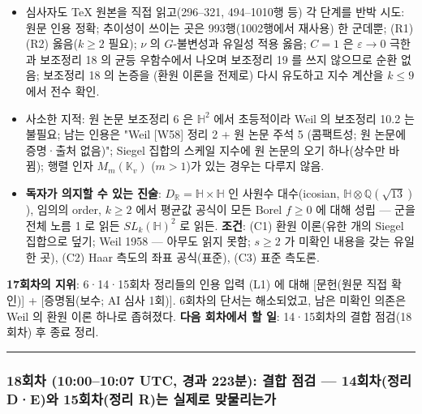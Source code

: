 \begin{itemize}
\tightlist
\item
  심사자도 TeX 원본을 직접 읽고(296--321, 494--1010행 등) 각 단계를 반박 시도: 원문 인용 정확; 추이성이 쓰이는 곳은 993행(1002행에서 재사용) 한 군데뿐; (R1)(R2) 옳음(\(k\ge2\) 필요); \(\nu\) 의 \(G\)-불변성과 유일성 적용 옳음; \(C=1\) 은 \(\varepsilon\to0\) 극한과 보조정리 18 의 균등 우함수에서 나오며 보조정리 19 를 쓰지 않으므로 순환 없음; 보조정리 18 의 논증을 (환원 이론을 전제로) 다시 유도하고 지수 계산을 \(k\le9\) 에서 전수 확인.
\item
  사소한 지적: 원 논문 보조정리 6 은 \(\mathbb H^2\) 에서 초등적이라 Weil 의 보조정리 10.2 는 불필요; 남는 인용은 "Weil {[}W58{]} 정리 2 + 원 논문 주석 5 (콤팩트성; 원 논문에 증명·출처 없음)"; Siegel 집합의 스케일 지수에 원 논문의 오기 하나(상수만 바뀜); 행렬 인자 \(M_m(\mathbb K_v)\) (\(m>1\))가 있는 경우는 다루지 않음.
\item
  \textbf{독자가 의지할 수 있는 진술}: \(D_\mathbb R=\mathbb H\times\mathbb H\) 인 사원수 대수(icosian, \(\mathbb H\otimes\mathbb Q(\sqrt{13})\)), 임의의 order, \(k\ge2\) 에서 평균값 공식이 모든 Borel \(f\ge0\) 에 대해 성립 --- 군을 전체 노름 1 로 읽든 \(SL_k(\mathbb H)^2\) 로 읽든. \textbf{조건}: (C1) 환원 이론(유한 개의 Siegel 집합으로 덮기; Weil 1958 --- 아무도 읽지 못함; \(s\ge2\) 가 미확인 내용을 갖는 유일한 곳), (C2) Haar 측도의 좌표 공식(표준), (C3) 표준 측도론.
\end{itemize}

\textbf{17회차의 지위}: 6·14·15회차 정리들의 인용 입력 (L1) 에 대해 {[}문헌(원문 직접 확인){]} + {[}증명됨(보수; AI 심사 1회){]}. 6회차의 단서는 해소되었고, 남은 미확인 의존은 Weil 의 환원 이론 하나로 좁혀졌다. \textbf{다음 회차에서 할 일}: 14·15회차의 결합 점검(18회차) 후 종료 정리.

\begin{center}\rule{0.5\linewidth}{0.5pt}\end{center}

\hypertarget{uxd68cuxcc28-10001007-utc-uxacbduxacfc-223uxbd84-uxacb0uxd569-uxc810uxac80-14uxd68cuxcc28uxc815uxb9ac-deuxc640-15uxd68cuxcc28uxc815uxb9ac-ruxb294-uxc2e4uxc81cuxb85c-uxb9deuxbb3cuxb9acuxb294uxac00}{%
\subsubsection*{18회차 (10:00--10:07 UTC, 경과 223분): 결합 점검 --- 14회차(정리 D·E)와 15회차(정리 R)는 실제로 맞물리는가}\label{uxd68cuxcc28-10001007-utc-uxacbduxacfc-223uxbd84-uxacb0uxd569-uxc810uxac80-14uxd68cuxcc28uxc815uxb9ac-deuxc640-15uxd68cuxcc28uxc815uxb9ac-ruxb294-uxc2e4uxc81cuxb85c-uxb9deuxbb3cuxb9acuxb294uxac00}}

